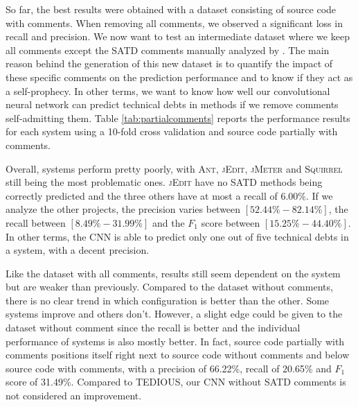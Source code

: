 So far, the best results were obtained with a dataset consisting of source code with comments. When removing all comments, we observed a significant loss in recall and precision. We now want to test an intermediate dataset where we keep all comments except the SATD comments manually analyzed by \citet{maldonado17}. The main reason behind the generation of this new dataset is to quantify the impact of these specific comments on the prediction performance and to know if they act as a self-prophecy. In other terms, we want to know how well our convolutional neural network can predict technical debts in methods if we remove comments self-admitting them. Table \ref{tab:partialcomments} reports the performance results for each system using a 10-fold cross validation and source code partially with comments.


Overall, systems perform pretty poorly, with \textsc{Ant}, \textsc{jEdit}, \textsc{jMeter} and \textsc{Squirrel} still being the most problematic ones. \textsc{jEdit} have no SATD methods being correctly predicted and the three others have at most a recall of 6.00\%. If we analyze the other projects, the precision varies between $[52.44\%-82.14\%]$, the recall between $[8.49\%-31.99\%]$ and the $F_1$ score between $[15.25\%-44.40\%]$. In other terms, the CNN is able to predict only one out of five technical debts in a system, with a decent precision. 


Like the dataset with all comments, results still seem dependent on the system but are weaker than previously. Compared to the dataset without comments, there is no clear trend in which configuration is better than the other. Some systems improve and others don't. However, a slight edge could be given to the dataset without comment since the recall is better and the individual performance of systems is also mostly better. In fact, source code partially with comments positions itself right next to source code without comments and below source code with comments, with a precision of 66.22\%, recall of 20.65\% and $F_1$ score of 31.49\%. Compared to TEDIOUS, our CNN without SATD comments is not considered an improvement.

